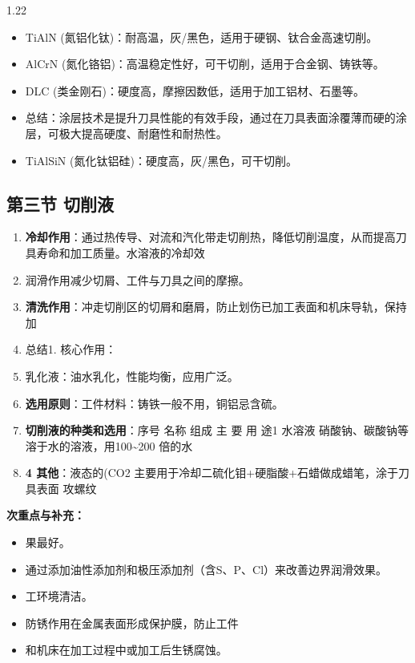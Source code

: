 \documentclass[12pt,a4paper]{article}
\begin{document}
\begin{spacing}{1.22}
\begin{itemize}[leftmargin=2.2em,label=--]
  \item TiAlN (氮铝化钛)：耐高温，灰/黑色，适用于硬钢、钛合金高速切削。
  \item AlCrN (氮化铬铝)：高温稳定性好，可干切削，适用于合金钢、铸铁等。
  \item DLC (类金刚石)：硬度高，摩擦因数低，适用于加工铝材、石墨等。
  \item 总结：涂层技术是提升刀具性能的有效手段，通过在刀具表面涂覆薄而硬的涂层，可极大提高硬度、耐磨性和耐热性。
  \item TiAlSiN (氮化钛铝硅)：硬度高，灰/黑色，可干切削。
\end{itemize}

\subsection{第三节 切削液}
\begin{tcolorbox}[colback=yellow!6,colframe=red!55!black,title=重点,left=1mm,right=1mm]
\begin{enumerate}[leftmargin=2.2em,label=\arabic*.]
  \item \textbf{冷却作用}：通过热传导、对流和汽化带走切削热，降低切削温度，从而提高刀具寿命和加工质量。水溶液的冷却效
  \item 润滑作用减少切屑、工件与刀具之间的摩擦。
  \item \textbf{清洗作用}：冲走切削区的切屑和磨屑，防止划伤已加工表面和机床导轨，保持加
  \item 总结1. 核心作用：
  \item 乳化液：油水乳化，性能均衡，应用广泛。
  \item \textbf{选用原则}：工件材料：铸铁一般不用，铜铝忌含硫。
  \item \textbf{切削液的种类和选用}：序号 名称 组成 主 要 用 途1 水溶液 硝酸钠、碳酸钠等溶于水的溶液，用100\textasciitilde{}200 倍的水
  \item \textbf{4 其他}：液态的(CO2 主要用于冷却二硫化钼+硬脂酸+石蜡做成蜡笔，涂于刀具表面 攻螺纹
\end{enumerate}
\end{tcolorbox}
\noindent\textbf{次重点与补充：}
\begin{itemize}[leftmargin=2.2em,label=--]
  \item 果最好。
  \item 通过添加油性添加剂和极压添加剂（含S、P、Cl）来改善边界润滑效果。
  \item 工环境清洁。
  \item 防锈作用在金属表面形成保护膜，防止工件
  \item 和机床在加工过程中或加工后生锈腐蚀。

\end{itemize}
\end{spacing}
\end{document}

